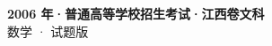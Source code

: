 \documentclass[zihao=-4, a4paper]{ctexart}
\begin{document}
\begin{center}
  {\Large\bfseries 2006 年·普通高等学校招生考试·江西卷文科}\\[4pt]
  {\large 数学 · 试题版}
\end{center}
\medskip
{}

\end{document}
